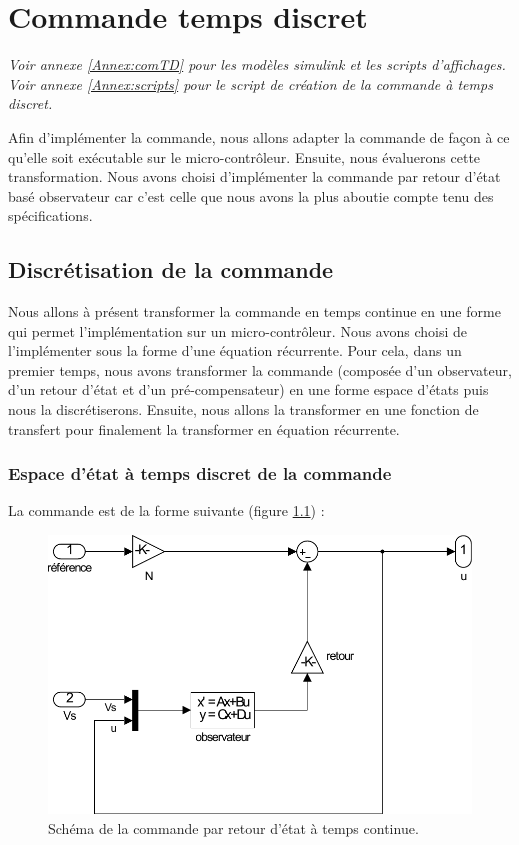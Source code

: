 \chapter{Commande temps discret}
\begin{center}
\textit{Voir annexe \ref{Annex:comTD} pour les modèles simulink et les scripts d'affichages.\\
Voir annexe \ref{Annex:scripts} pour le script de création de la commande à temps discret.}
\end{center}
Afin d'implémenter la commande, nous allons adapter la commande de façon à ce qu'elle soit exécutable sur le micro-contrôleur. Ensuite, nous évaluerons cette transformation. Nous avons choisi d'implémenter la commande par retour d'état basé observateur car c'est celle que nous avons la plus aboutie compte tenu des spécifications. 
\section{Discrétisation de la commande}
Nous allons à présent transformer la commande en temps continue en une forme qui permet l'implémentation sur un micro-contrôleur. Nous avons choisi de l'implémenter sous la forme d'une équation récurrente. Pour cela, dans un premier temps, nous avons transformer la commande (composée d'un observateur, d'un retour d'état et d'un pré-compensateur) en une forme espace d'états puis nous la discrétiserons. Ensuite, nous allons la transformer en une fonction de transfert pour finalement la transformer en équation récurrente.
	\subsection{Espace d'état à temps discret de la commande}
La commande est de la forme suivante (figure \ref{fig:comTC}) : 
\begin{figure}[!ht]
\centering
\includegraphics[width=.4\textwidth]{./V/images/Com_asserv.pdf}
\caption{\label{fig:comTC}Schéma de la commande par retour d'état à temps continue.}
\end{figure}


